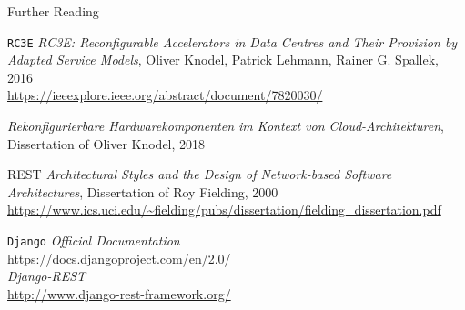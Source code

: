 \documentclass{beamer}
\newcommand{\rccce}{\texttt{RC3E}}
\newcommand{\django}{\texttt{Django}}
\begin{document}
    \begin{frame}[allowframebreaks]{Further Reading}
    
        \begin{block}{\rccce}
            \emph{RC3E: Reconfigurable Accelerators in Data Centres and Their Provision by Adapted Service Models},
            Oliver Knodel, Patrick Lehmann, Rainer G. Spallek, 2016\\
            \url{https://ieeexplore.ieee.org/abstract/document/7820030/}
            \vspace{1 em}
        
            \emph{Rekonfigurierbare Hardwarekomponenten im Kontext von Cloud-Architekturen}, 
            Dissertation of Oliver Knodel, 2018 \\
            \color{gray}{Publication pending}
        \end{block}
    
    \framebreak
    
        \begin{block}{REST}
            \emph{Architectural Styles and the Design of Network-based Software Architectures},
            Dissertation of Roy Fielding, 2000\\
            \url{https://www.ics.uci.edu/~fielding/pubs/dissertation/fielding_dissertation.pdf}
        \end{block}
        
    \framebreak
    
        \begin{block}{\django}
            \emph{Official Documentation} \\
            \url{https://docs.djangoproject.com/en/2.0/} \\
            \vspace{1em}
            \emph{Django-REST} \\
            \url{http://www.django-rest-framework.org/}
        \end{block}

    \end{frame}
    
\end{document}

